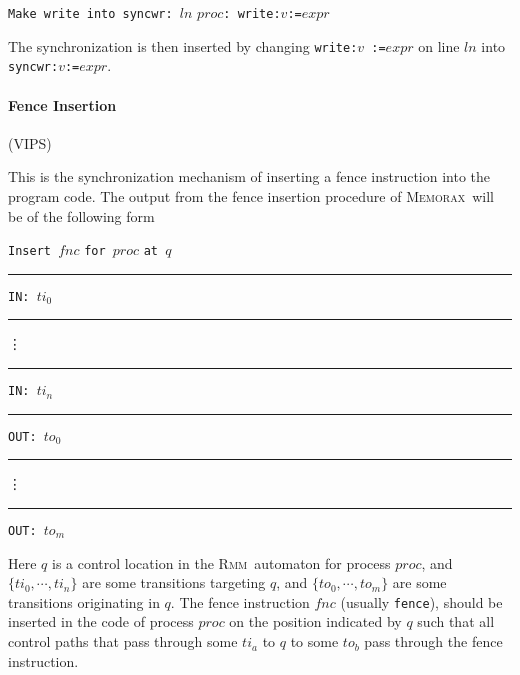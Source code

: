\documentclass[a4paper]{article}
\newcommand{\memorax}{\textsc{Memorax}}
\newcommand{\rmm}{\textsc{Rmm}}
\begin{document}
\vspace{10pt}

\noindent
{\tt Make write into syncwr: }$ln$ $proc${\tt : write:}$v${\tt :=}$expr$

\vspace{10pt}

The synchronization is then inserted by changing {\tt write:}$v${\tt
  :=}$expr$ on line $ln$ into {\tt syncwr:}$v${\tt :=}$expr$.

\paragraph{Fence Insertion}\hfill(VIPS)

This is the synchronization mechanism of inserting a fence instruction
into the program code. The output from the fence insertion procedure
of \memorax\ will be of the following form

\vspace{10pt}

\noindent
{\tt Insert }$fnc$ {\tt for }$proc$ {\tt at }$q$\\
\rule{10pt}{0pt}{\tt IN: }$ti_0$\\
\rule{10pt}{0pt}\vdots\\
\rule{10pt}{0pt}{\tt IN: }$ti_n$\\
\rule{10pt}{0pt}{\tt OUT: }$to_0$\\
\rule{10pt}{0pt}\vdots\\
\rule{10pt}{0pt}{\tt OUT: }$to_m$\\

\vspace{10pt}

Here $q$ is a control location in the \rmm\ automaton for process
$proc$, and $\{ti_0,\cdots,ti_n\}$ are some transitions targeting $q$,
and $\{to_0,\cdots,to_m\}$ are some transitions originating in
$q$.
%
The fence instruction $fnc$ (usually {\tt fence}), should be inserted
in the code of process $proc$ on the position indicated by $q$ such
that all control paths that pass through some $ti_a$ to $q$ to some
$to_b$ pass through the fence instruction.

{}



\pagebreak
{}
{}

\end{document}
